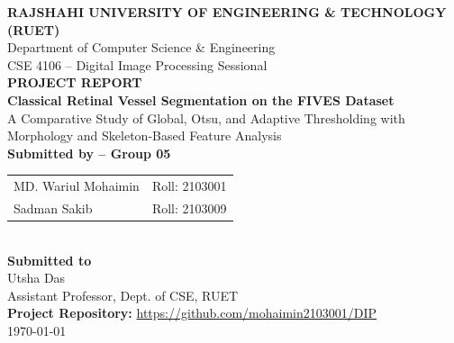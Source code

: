 \documentclass[12pt,a4paper]{article}
\newcommand{\course}{CSE 4106 -- Digital Image Processing Sessional}
\newcommand{\projecttitle}{Classical Retinal Vessel Segmentation on the FIVES Dataset}
\newcommand{\projectsubtitle}{A Comparative Study of Global, Otsu, and Adaptive Thresholding with Morphology and Skeleton-Based Feature Analysis}
\newcommand{\projectrepo}{\url{https://github.com/mohaimin2103001/DIP}}
\begin{document}
\begin{titlepage}
    \centering
    \vspace*{0.4cm}
    {\Large \textbf{RAJSHAHI UNIVERSITY OF ENGINEERING \& TECHNOLOGY (RUET)}}\\[0.25cm]
    {\large Department of Computer Science \& Engineering}\\[0.35cm]
    {\large \course}\\[1.15cm]

    {\Huge \textbf{PROJECT REPORT}}\\[1.0cm]
    {\LARGE \textbf{\projecttitle}}\\[0.45cm]
    {\large \projectsubtitle}\\[1.3cm]

    {\large \textbf{Submitted by -- Group 05}}\\[0.45cm]
    \begin{tabular}{>{\raggedright\arraybackslash}p{7cm} >{\raggedright\arraybackslash}p{4cm}}
        MD. Wariul Mohaimin & Roll: 2103001\\
        Sadman Sakib & Roll: 2103009\\
    \end{tabular}\\[1.3cm]

    {\large \textbf{Submitted to}}\\[0.35cm]
    {\large Utsha Das}\\
    Assistant Professor, Dept. of CSE, RUET\\[1.5cm]

    \vfill
    {\large \textbf{Project Repository:} \projectrepo}\\[0.35cm]
    {\large \today}
\end{titlepage}

\tableofcontents
\newpage
\end{document}
